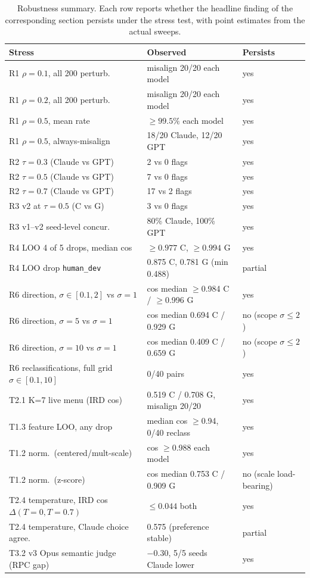 \documentclass[conference]{IEEEtran}
\begin{document}
\begin{table}[h]
\centering
\caption{Robustness summary. Each row reports whether the headline finding of the corresponding section persists under the stress test, with point estimates from the actual sweeps.}
\label{tab:robust}
\renewcommand{\arraystretch}{1.15}
\begin{tabular}{lll}
\toprule
Stress & Observed & Persists \\
\midrule
R1 $\rho{=}0.1$, all 200 perturb.   & misalign 20/20 each model      & yes \\
R1 $\rho{=}0.2$, all 200 perturb.   & misalign 20/20 each model      & yes \\
R1 $\rho{=}0.5$, mean rate          & $\ge 99.5\%$ each model        & yes \\
R1 $\rho{=}0.5$, always-misalign    & 18/20 Claude, 12/20 GPT        & yes \\
R2 $\tau{=}0.3$ (Claude vs GPT)     & 2 vs 0 flags                   & yes \\
R2 $\tau{=}0.5$ (Claude vs GPT)     & 7 vs 0 flags                   & yes \\
R2 $\tau{=}0.7$ (Claude vs GPT)     & 17 vs 2 flags                  & yes \\
R3 v2 at $\tau{=}0.5$ (C vs G)      & 3 vs 0 flags                   & yes \\
R3 v1--v2 seed-level concur.        & 80\% Claude, 100\% GPT         & yes \\
R4 LOO 4 of 5 drops, median cos     & $\ge 0.977$ C, $\ge 0.994$ G   & yes \\
R4 LOO drop \texttt{human\_dev}     & 0.875 C, 0.781 G (min 0.488)   & partial \\
R6 direction, $\sigma\in[0.1,2]$ vs $\sigma{=}1$ & cos median $\ge$0.984 C / $\ge$0.996 G & yes \\
R6 direction, $\sigma{=}5$ vs $\sigma{=}1$   & cos median 0.694 C / 0.929 G & no (scope $\sigma\!\le\!2$) \\
R6 direction, $\sigma{=}10$ vs $\sigma{=}1$  & cos median 0.409 C / 0.659 G & no (scope $\sigma\!\le\!2$) \\
R6 reclassifications, full grid $\sigma\in[0.1,10]$ & 0/40 pairs            & yes \\
T2.1 K=7 live menu (IRD cos)        & 0.519 C / 0.708 G, misalign 20/20 & yes \\
T1.3 feature LOO, any drop          & median cos $\ge$0.94, 0/40 reclass & yes \\
T1.2 norm.\ (centered/mult-scale)   & cos $\ge$0.988 each model         & yes \\
T1.2 norm.\ (z-score)               & cos median 0.753 C / 0.909 G      & no (scale load-bearing) \\
T2.4 temperature, IRD cos $\Delta(T{=}0,T{=}0.7)$ & $\le 0.044$ both    & yes \\
T2.4 temperature, Claude choice agree.\ & 0.575 (preference stable)     & partial \\
T3.2 v3 Opus semantic judge (RPC gap) & $-0.30$, 5/5 seeds Claude lower & yes \\
\bottomrule
\end{tabular}
\end{table}
\end{document}
